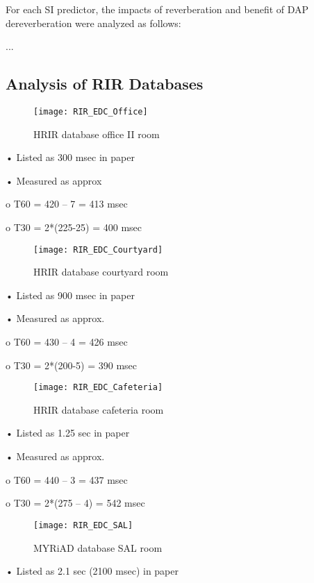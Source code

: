 For each SI predictor, the impacts of reverberation and benefit of DAP dereverberation were analyzed as follows:

...



\subsection{Analysis of RIR Databases} \label{sec:rir_databases}




\begin{figure}[H]
	\texttt{[image: RIR\_EDC\_Office]}
	\centering
	\caption{HRIR database office II room}
	\label{fig:RIR_EDC_Office}
\end{figure}

•	Listed as 300 msec in paper

•	Measured as approx 

o	T60 = 420 – 7 = 413 msec

o	T30 = 2*(225-25) = 400 msec 



\begin{figure}[H]
	\texttt{[image: RIR\_EDC\_Courtyard]}
	\centering
	\caption{HRIR database courtyard room}
	\label{fig:RIR_EDC_Courtyard}
\end{figure}

•	Listed as 900 msec in paper

•	Measured as approx. 

o	T60 = 430 – 4 = 426 msec

o	T30 = 2*(200-5) = 390 msec


\begin{figure}[H]
	\texttt{[image: RIR\_EDC\_Cafeteria]}
	\centering
	\caption{HRIR database cafeteria room}
	\label{fig:RIR_EDC_Cafeteria}
\end{figure}

•	Listed as 1.25 sec in paper

•	Measured as approx. 

o	T60 = 440 – 3 = 437 msec

o	T30 = 2*(275 – 4) = 542 msec


\begin{figure}[H]
	\texttt{[image: RIR\_EDC\_SAL]}
	\centering
	\caption{MYRiAD database SAL room}
	\label{fig:RIR_EDC_SAL}
\end{figure}

•	Listed as 2.1 sec (2100 msec) in paper

